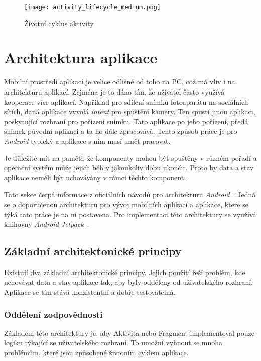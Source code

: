 \begin{figure}[h!]
    \centering
    \vspace{0.5cm}
    \texttt{[image: activity\_lifecycle\_medium.png]}
    \caption[Životní cyklus aktivity]{Životní cyklus aktivity~\cite{activity-life-cycle}}
    \label{diagram:activity_lifecycle}
\end{figure}

\newpage
\section{Architektura aplikace}
 Mobilní prostředí aplikací je velice odlišné od toho na PC, což má vliv i na architekturu aplikací. Zejména je to dáno tím, že uživatel často využívá kooperace více aplikací. Například pro sdílení snímků fotoaparátu na sociálních sítích, daná aplikace vyvolá \emph{intent} pro spuštění kamery. Ten spustí jinou aplikaci, poskytující rozhraní pro pořízení snímku. Tato aplikace po jeho pořízení, předá snímek původní aplikaci a ta ho dále zpracovává. Tento způsob práce je pro \emph{Android} typický a aplikace s ním musí umět pracovat.

 Je důležité mít na paměti, že komponenty mohou být spuštěny v různém pořadí a operační systém může jejich běh v jakoukoliv dobu ukončit. Proto by data a stav aplikace neměli být uchovávány v rámci těchto komponent.
 
 Tato sekce čerpá informace z oficiálních návodů pro architekturu \emph{Android}~. Jedná se o doporučenou architekturu pro vývoj mobilních aplikací a aplikace, které se týká tato práce je na ní postavena. Pro implementaci této architektury se využívá knihovny \emph{Android Jetpack}~.

    \subsection{Základní architektonické principy}
    Existují dva základní architektonické principy. Jejich použití řeší problém, kde uchovávat data a stav aplikace tak, aby byly odděleny od uživatelského rozhraní. Aplikace se tím stává konzistentní a dobře testovatelná.

        \subsubsection{Oddělení zodpovědnosti}
        Základem této architektury je, aby Aktivita nebo Fragment implementoval pouze logiku týkající se uživatelského rozhraní. To umožní vyhnout se mnoha problémům, které jsou způsobené životním cyklem aplikace.


